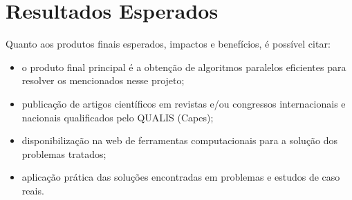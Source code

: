 \documentclass[a4paper, 12pt] {article}
\begin{document}
\begin{table}[htbp]
\begin{center}
\end{center}
\caption{Cronograna de Execução do Projeto Previsto}
\label{tab:cronograma}
\end{table}



\section{Resultados Esperados}

Quanto aos produtos finais esperados, impactos e benefícios, é possível citar:

\begin{itemize}
  \item o produto final principal é a obtenção de algoritmos paralelos
  eficientes para resolver os mencionados nesse projeto;
  \item publicação de artigos científicos em revistas e/ou congressos
  internacionais e nacionais qualificados pelo QUALIS (Capes);
  \item disponibilização na web de ferramentas computacionais para a solução dos
  problemas tratados;
  \item aplicação prática das soluções encontradas em problemas e estudos de
  caso reais.
\end{itemize}



\end{document}
